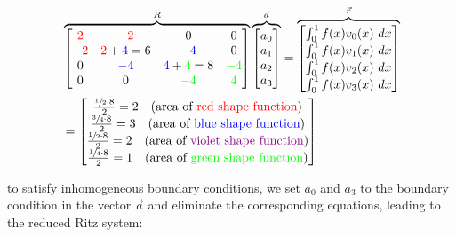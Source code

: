 \begin{align*}
    & \overbrace{
        \begin{bmatrix}
            {\color{red}2} & {\color{red}-2} & 0 & 0 \\
            {\color{red}-2} & {\color{red}2} + {\color{blue}4} = 6 & {\color{blue}-4} & 0 \\
            0 & {\color{blue}-4} & {\color{blue}4} + {\color{green}4} = 8 & {\color{green}-4} \\
            0 & 0 & {\color{green}-4} & {\color{green}4}
        \end{bmatrix}
    }^R
    \overbrace{
        \begin{bmatrix}
            a_0 \\
            a_1 \\
            a_2 \\
            a_3
        \end{bmatrix}
    }^{\vec{a}}
    =
    \overbrace{
        \begin{bmatrix}
            \int_0^1 f(x)v_0(x)\ dx \\
            \int_0^1 f(x)v_1(x)\ dx \\
            \int_0^1 f(x)v_2(x)\ dx \\
            \int_0^1 f(x)v_3(x)\ dx
        \end{bmatrix}
    }^{\vec{r}} \\
    & =
    \begin{bmatrix}
        \frac{\sfrac{1}{2}\cdot 8}{2} = 2\quad\text{(area of {\color{red} red shape function})} \\
        \frac{\sfrac{3}{4}\cdot 8}{2} = 3\quad\text{(area of {\color{blue} blue shape function})} \\
        \frac{\sfrac{1}{2}\cdot 8}{2} = 2\quad\text{(area of {\color{violet} violet shape function})} \\
        \frac{\sfrac{1}{4}\cdot 8}{2} = 1\quad\text{(area of {\color{green} green shape function})} \\
    \end{bmatrix}
\end{align*}

to satisfy inhomogeneous boundary conditions, we set $a_0$ and $a_3$ to the boundary condition in the vector $\vec{a}$ and
eliminate the corresponding equations, leading to the reduced Ritz system:

